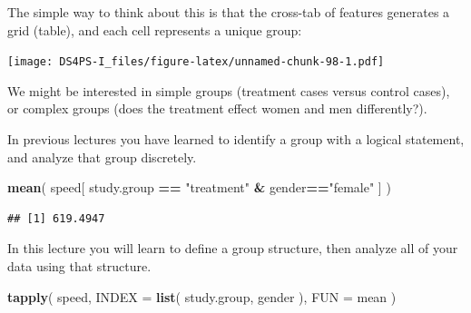 \documentclass[]{book}
\newenvironment{Shaded}{\begin{snugshade}}{\end{snugshade}}
\newcommand{\DataTypeTok}[1]{\textcolor[rgb]{0.13,0.29,0.53}{#1}}
\newcommand{\KeywordTok}[1]{\textcolor[rgb]{0.13,0.29,0.53}{\textbf{#1}}}
\newcommand{\NormalTok}[1]{#1}
\newcommand{\OperatorTok}[1]{\textcolor[rgb]{0.81,0.36,0.00}{\textbf{#1}}}
\newcommand{\StringTok}[1]{\textcolor[rgb]{0.31,0.60,0.02}{#1}}
\theoremstyle{definition}
\theoremstyle{definition}
\theoremstyle{definition}
\theoremstyle{remark}
\begin{document}
The simple way to think about this is that the cross-tab of features
generates a grid (table), and each cell represents a unique group:

\texttt{[image: DS4PS-I\_files/figure-latex/unnamed-chunk-98-1.pdf]}

We might be interested in simple groups (treatment cases versus control
cases), or complex groups (does the treatment effect women and men
differently?).

In previous lectures you have learned to identify a group with a logical
statement, and analyze that group discretely.

\begin{Shaded}
\begin{Highlighting}[]
\KeywordTok{mean}\NormalTok{( speed[ study.group }\OperatorTok{==}\StringTok{ "treatment"} \OperatorTok{&}\StringTok{ }\NormalTok{gender}\OperatorTok{==}\StringTok{"female"}\NormalTok{ ] )}
\end{Highlighting}
\end{Shaded}

\begin{verbatim}
## [1] 619.4947
\end{verbatim}

In this lecture you will learn to define a group structure, then analyze
all of your data using that structure.

\begin{Shaded}
\begin{Highlighting}[]
\KeywordTok{tapply}\NormalTok{( speed, }\DataTypeTok{INDEX =} \KeywordTok{list}\NormalTok{( study.group, gender ), }\DataTypeTok{FUN =}\NormalTok{ mean )}
\end{Highlighting}
\end{Shaded}
\end{document}
